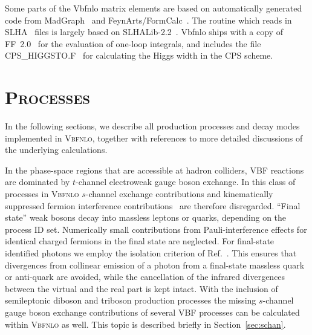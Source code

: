 \documentclass[english,12pt]{article}
\begin{document}
Some parts of the {\sc Vbfnlo} matrix elements are based on automatically
generated code from {\sc MadGraph}~\cite{Stelzer:1994ta, Alwall:2007st}
and {\sc FeynArts/FormCalc}~\cite{Kublbeck:1990xc, Denner:1992vza, 
Kublbeck:1992mt, Hahn:2000kx, Hahn:2001rv, Hahn:1998yk, Hahn:2006zy, Hahn:2006qw}.
The routine which reads in SLHA~\cite{Allanach:2008qq} files is largely based 
on {\sc SLHALib-2.2}~\cite{Hahn:2006nq}.
{\sc Vbfnlo} ships with a copy of {\sc FF~2.0}~\cite{vanOldenborgh:1989wn}
for the evaluation of one-loop integrals, and includes the file {\sc
CPS\_HIGGSTO.F}~\cite{Passarino:2010qk,Goria:2011wa} for calculating the
Higgs width in the CPS scheme.

\newpage

\section{\textsc{Processes}}
\label{sec:proc}
In the following sections, we describe all production processes and decay
modes implemented in \textsc{Vbfnlo}, together with references to more
detailed discussions of the underlying calculations.

In the phase-space regions that are accessible at hadron colliders, VBF
reactions are dominated by $t$-channel electroweak gauge boson exchange. In this
class of processes in \textsc{Vbfnlo} $s$-channel exchange contributions and
kinematically suppressed fermion interference
contributions~\cite{CO,Andersen:2007mp,Bredenstein:2008tm} are therefore
disregarded.  ``Final state'' weak bosons decay into massless leptons or
quarks, depending on the process ID set.
Numerically small contributions from Pauli-interference effects for identical
charged fermions in the final state are neglected.   For final-state identified photons we employ
the isolation criterion of Ref.~\cite{Frixione:1998jh}. This ensures that
divergences from collinear emission of a photon from a final-state massless
quark or anti-quark are avoided, while the cancellation of the infrared
divergences between the virtual and the real part is kept intact.
With the inclusion of semileptonic diboson and triboson production processes
the missing $s$-channel gauge boson exchange contributions of several VBF processes
can be calculated within \textsc{Vbfnlo} as well. This topic is described
briefly in Section~\ref{sec:schan}.
\end{document}
